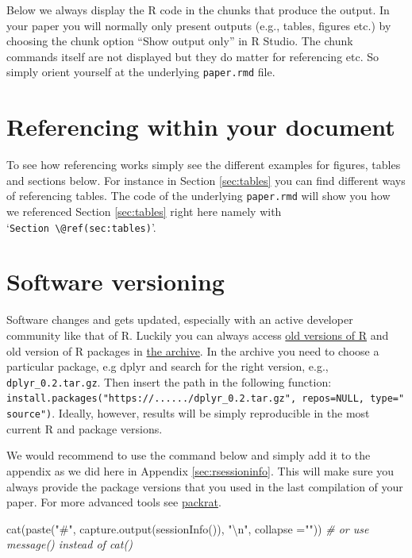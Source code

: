 \documentclass[
  12pt,
]{article}
\newenvironment{Shaded}{\begin{snugshade}}{\end{snugshade}}
\newcommand{\AttributeTok}[1]{\textcolor[rgb]{0.77,0.63,0.00}{#1}}
\newcommand{\CommentTok}[1]{\textcolor[rgb]{0.56,0.35,0.01}{\textit{#1}}}
\newcommand{\FunctionTok}[1]{\textcolor[rgb]{0.00,0.00,0.00}{#1}}
\newcommand{\NormalTok}[1]{#1}
\newcommand{\SpecialCharTok}[1]{\textcolor[rgb]{0.00,0.00,0.00}{#1}}
\newcommand{\StringTok}[1]{\textcolor[rgb]{0.31,0.60,0.02}{#1}}
\begin{document}
Below we always display the R code in the chunks that produce the output. In your paper you will normally only present outputs (e.g., tables, figures etc.) by choosing the chunk option ``Show output only'' in R Studio. The chunk commands itself are not displayed but they do matter for referencing etc. So simply orient yourself at the underlying \texttt{paper.rmd} file.

\hypertarget{referencing-within-your-document}{%
\section{Referencing within your document}\label{referencing-within-your-document}}

To see how referencing works simply see the different examples for figures, tables and sections below. For instance in Section \ref{sec:tables} you can find different ways of referencing tables. The code of the underlying \texttt{paper.rmd} will show you how we referenced Section \ref{sec:tables} right here namely with `\texttt{Section\ \textbackslash{}@ref(sec:tables)}'.

\hypertarget{software-versioning}{%
\section{Software versioning}\label{software-versioning}}

Software changes and gets updated, especially with an active developer community like that of R. Luckily you can always access \href{https://cran.r-project.org/bin/windows/base/old/}{old versions of R} and old version of R packages in \href{https://cran.r-project.org/src/contrib/Archive/}{the archive}. In the archive you need to choose a particular package, e.g dplyr and search for the right version, e.g., \texttt{dplyr\_0.2.tar.gz}. Then insert the path in the following function: \texttt{install.packages("https://....../dplyr\_0.2.tar.gz",\ repos=NULL,\ type="source")}. Ideally, however, results will be simply reproducible in the most current R and package versions.

We would recommend to use the command below and simply add it to the appendix as we did here in Appendix \ref{sec:rsessioninfo}. This will make sure you always provide the package versions that you used in the last compilation of your paper. For more advanced tools see \href{https://rstudio.github.io/packrat/}{packrat}.

\begin{Shaded}
\begin{Highlighting}[]
\FunctionTok{cat}\NormalTok{(}\FunctionTok{paste}\NormalTok{(}\StringTok{"\#"}\NormalTok{, }\FunctionTok{capture.output}\NormalTok{(}\FunctionTok{sessionInfo}\NormalTok{()), }\StringTok{"}\SpecialCharTok{\textbackslash{}n}\StringTok{"}\NormalTok{, }\AttributeTok{collapse =}\StringTok{""}\NormalTok{)) }
  \CommentTok{\# or use message() instead of cat()}
\end{Highlighting}
\end{Shaded}
\end{document}
